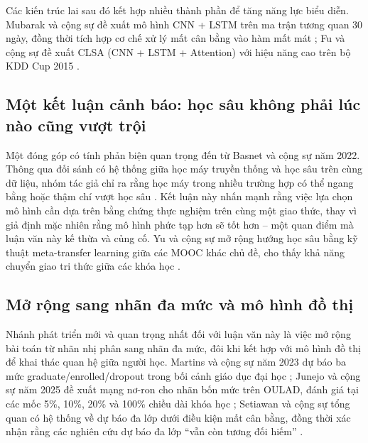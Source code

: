 Các kiến trúc lai sau đó kết hợp nhiều thành phần để tăng năng lực biểu diễn. Mubarak và cộng sự đề xuất mô hình CNN + LSTM trên ma trận tương quan 30 ngày, đồng thời tích hợp cơ chế xử lý mất cân bằng vào hàm mất mát \cite{Mubarak2021}; Fu và cộng sự đề xuất CLSA (CNN + LSTM + Attention) với hiệu năng cao trên bộ KDD Cup 2015 \cite{Fu2021}.

\subsection{Một kết luận cảnh báo: học sâu không phải lúc nào cũng vượt trội}

Một đóng góp có tính phản biện quan trọng đến từ Basnet và cộng sự năm 2022. Thông qua đối sánh có hệ thống giữa học máy truyền thống và học sâu trên cùng dữ liệu, nhóm tác giả chỉ ra rằng học máy trong nhiều trường hợp có thể ngang bằng hoặc thậm chí vượt học sâu \cite{Basnet2022}. Kết luận này nhấn mạnh rằng việc lựa chọn mô hình cần dựa trên bằng chứng thực nghiệm trên cùng một giao thức, thay vì giả định mặc nhiên rằng mô hình phức tạp hơn sẽ tốt hơn -- một quan điểm mà luận văn này kế thừa và củng cố. Yu và cộng sự mở rộng hướng học sâu bằng kỹ thuật meta-transfer learning giữa các MOOC khác chủ đề, cho thấy khả năng chuyển giao tri thức giữa các khóa học \cite{Yu2022}.

\subsection{Mở rộng sang nhãn đa mức và mô hình đồ thị}

Nhánh phát triển mới và quan trọng nhất đối với luận văn này là việc mở rộng bài toán từ nhãn nhị phân sang nhãn đa mức, đôi khi kết hợp với mô hình đồ thị để khai thác quan hệ giữa người học. Martins và cộng sự năm 2023 dự báo ba mức graduate/enrolled/dropout trong bối cảnh giáo dục đại học \cite{Martins2023}; Junejo và cộng sự năm 2025 đề xuất mạng nơ-ron cho nhãn bốn mức trên OULAD, đánh giá tại các mốc 5\%, 10\%, 20\% và 100\% chiều dài khóa học \cite{Junejo2025}; Setiawan và cộng sự tổng quan có hệ thống về dự báo đa lớp dưới điều kiện mất cân bằng, đồng thời xác nhận rằng các nghiên cứu dự báo đa lớp ``vẫn còn tương đối hiếm'' \cite{Setiawan2026}.

